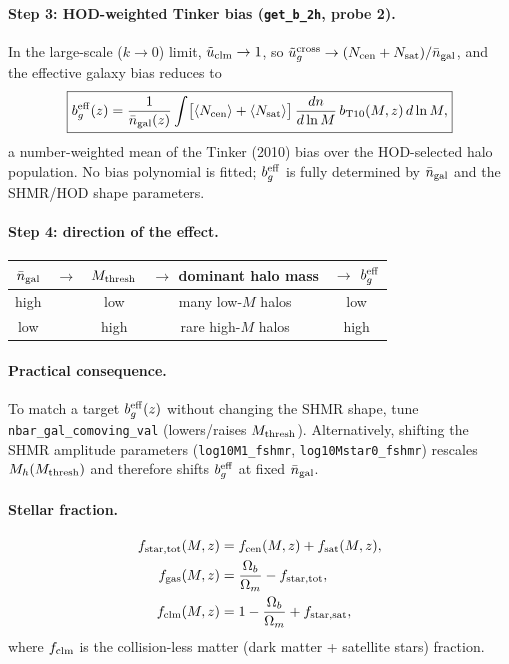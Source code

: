 \documentclass[12pt,a4paper]{article}
\newcommand{\code}[1]{\texttt{\small #1}}
\newcommand{\param}[1]{\texttt{\small #1}}
\begin{document}
\paragraph{Step 3: HOD-weighted Tinker bias (\code{get\_b\_2h}, probe 2).}
In the large-scale ($k\to 0$) limit, $\tilde{u}_{\rm clm}\to 1$, so
$\tilde{u}_g^{\rm cross}\to(N_{\rm cen}+N_{\rm sat})/\bar{n}_{\rm gal}$, and the
effective galaxy bias reduces to
\begin{equation}
  \boxed{b_g^{\rm eff}(z) = \frac{1}{\bar{n}_{\rm gal}(z)}
  \int \bigl[\langle N_{\rm cen}\rangle + \langle N_{\rm sat}\rangle\bigr]\,
  \frac{dn}{d\ln M}\,b_{\rm T10}(M,z)\,d\ln M,}
\end{equation}
a number-weighted mean of the Tinker (2010) bias over the HOD-selected halo
population. No bias polynomial is fitted; $b_g^{\rm eff}$ is fully determined by
$\bar{n}_{\rm gal}$ and the SHMR/HOD shape parameters.

\paragraph{Step 4: direction of the effect.}
\begin{center}
\begin{tabular}{ccccc}
\toprule
$\bar{n}_{\rm gal}$ & $\to$ & $M_{\rm thresh}$ & $\to$ dominant halo mass & $\to$ $b_g^{\rm eff}$ \\
\midrule
high & & low & many low-$M$ halos & low \\
low  & & high & rare high-$M$ halos & high \\
\bottomrule
\end{tabular}
\end{center}

\paragraph{Practical consequence.}
To match a target $b_g^{\rm eff}(z)$ without changing the SHMR shape, tune
\param{nbar\_gal\_comoving\_val} (lowers/raises $M_{\rm thresh}$).
Alternatively, shifting the SHMR amplitude parameters
(\param{log10M1\_fshmr}, \param{log10Mstar0\_fshmr}) rescales $M_h(M_{\rm thresh})$
and therefore shifts $b_g^{\rm eff}$ at fixed $\bar{n}_{\rm gal}$.

\paragraph{Stellar fraction.}
\begin{align}
  f_{\rm star,tot}(M,z) &= f_{\rm cen}(M,z) + f_{\rm sat}(M,z), \\
  f_{\rm gas}(M,z) &= \frac{\Omega_b}{\Omega_m} - f_{\rm star,tot}, \\
  f_{\rm clm}(M,z) &= 1 - \frac{\Omega_b}{\Omega_m} + f_{\rm star,sat},
\end{align}
where $f_{\rm clm}$ is the collision-less matter (dark matter + satellite stars) fraction.
\end{document}
